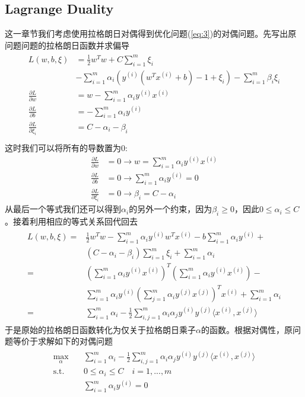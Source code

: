 \documentclass[11pt]{article}
\begin{document}
\subsection{Lagrange Duality}
这一章节我们考虑使用拉格朗日对偶得到优化问题(\ref{eq:3})的对偶问题。先写出原问题问题的拉格朗日函数并求偏导
\begin{align}
\begin{split}
L(w, b, \xi) &= \frac{1}{2}w^Tw + C\sum_{i=1}^m\xi_i\\
&-\sum_{i=1}^m\alpha_i\left(y^{(i)}(w^Tx^{(i)} +b) - 1 + \xi_i\right) - \sum_{i=1}^m\beta_i\xi_i\\
\frac{\partial L}{\partial w} &= w - \sum_{i=1}^m\alpha_iy^{(i)}x^{(i)}\\
\frac{\partial L}{\partial b} &= -\sum_{i=1}^m\alpha_iy^{(i)}\\
\frac{\partial L}{\partial \xi_i} &= C-\alpha_i-\beta_i\\
\end{split}
\end{align}
这时我们可以将所有的导数置为0:
\begin{align}
\frac{\partial L}{\partial w}&=0\to w = \sum_{i=1}^m\alpha_iy^{(i)}x^{(i)}\\
\frac{\partial L}{\partial b}&=0\to\sum_{i=1}^m\alpha_iy^{(i)}=0\\
\frac{\partial L}{\partial \xi_i}&=0\to\beta_i= C-\alpha_i
\end{align}
从最后一个等式我们还可以得到$\alpha_i$的另外一个约束，因为$\beta_i\geq 0$，因此$0\leq \alpha_i \leq C$。接着利用相应的等式关系回代回去
\begin{align}
\begin{split}
L(w, b, \xi) =& \frac{1}{2}w^Tw -\sum_{i=1}^m\alpha_iy^{(i)}w^Tx^{(i)}-b\sum_{i=1}^m\alpha_iy^{(i)}+\\ &(C-\alpha_i-\beta_i)\sum_{i=1}^m\xi_i+\sum_{i=1}^m\alpha_i\\
=&\left(\sum_{i=1}^m\alpha_iy^{(i)}x^{(i)}\right)^T\left(\sum_{i=1}^m\alpha_iy^{(i)}x^{(i)}\right)-\\
&\sum_{i=1}^m\alpha_iy^{(i)}\left(\sum_{j=1}^m\alpha_iy^{(j)}x^{(j)}\right)^Tx^{(i)} +\sum_{i=1}^m\alpha_i\\
=&\sum_{i=1}^m\alpha_i-\frac{1}{2}\sum_{i,j=1}^m\alpha_i\alpha_jy^{(i)}y^{(j)}\langle x^{(i)}, x^{(j)}\rangle
\end{split}
\end{align}
于是原始的拉格朗日函数转化为仅关于拉格朗日乘子$\alpha$的函数。根据对偶性，原问题等价于求解如下的对偶问题
\begin{align}\label{eq:1}
\begin{split}
\max_\alpha\quad&\sum_{i=1}^m\alpha_i-\frac{1}{2}\sum_{i,j=1}^m\alpha_i\alpha_jy^{(i)}y^{(j)}\langle x^{(i)}, x^{(j)}\rangle\\
\text{s.t.}\quad&0\leq\alpha_i\leq C\quad i=1,...,m\\
&\sum_{i=1}^m\alpha_iy^{(i)}=0
\end{split}
\end{align}
\end{document}
